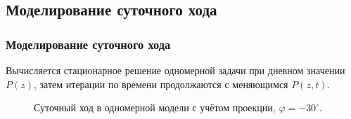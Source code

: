 \documentclass[9pt, apectratio=43,unicode]{beamer}
\begin{document}
\subsection{Моделирование суточного хода}
\begin{frame}\frametitle{Моделирование суточного хода}

Вычисляется стационарное решение одномерной задачи при дневном значении $P(z)$, затем итерации по времени продолжаются с меняющимся $P(z, t)$.

\begin{figure}[H]
\caption{Суточный ход в одномерной модели с учётом проекции, $\varphi = -30^\circ$.}
\end{figure}

\end{frame}
\end{document}
